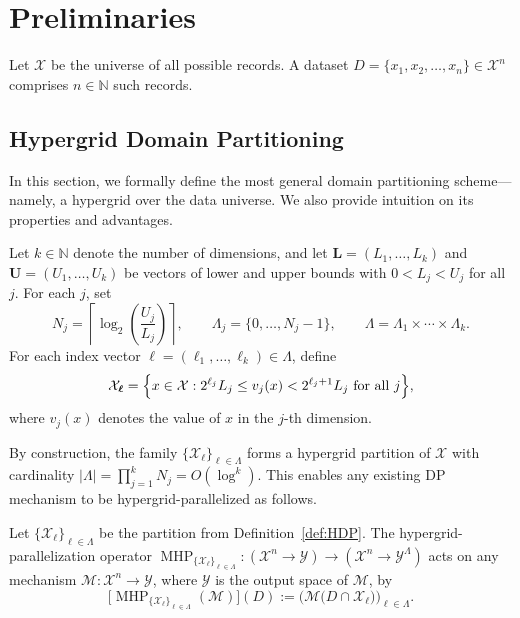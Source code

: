 \section{Preliminaries}
Let $\mathcal{X}$ be the universe of all possible records.  
A dataset $D=\{x_{1},x_{2},\ldots,x_{n}\}\in\mathcal{X}^{n}$ comprises $n\in\mathbb{N}$ such records.


\subsection{Hypergrid Domain Partitioning}
In this section, we formally define the most general domain partitioning scheme—namely, a hypergrid over the data universe.
We also provide intuition on its properties and advantages.

\begin{definition}\label{def:HDP}
Let $k\in\mathbb{N}$ denote the number of dimensions, and let $\mathbf{L}=(L_{1},\dots,L_{k})$ and $\mathbf{U}=(U_{1},\dots,U_{k})$ be vectors of lower and upper bounds
with $0<L_{j}<U_{j}$ for all $j$.  
For each $j$, set
\begin{equation*}
    N_{j}= \left\lceil \log_{2}\!\left( \frac{U_{j}}{L_{j}} \right) \right\rceil,
    \qquad
    \Lambda_{j}= \{0,\dots,N_{j}-1\},
    \qquad
    \Lambda=\Lambda_{1}\times\cdots\times\Lambda_{k}.
\end{equation*}
For each index vector $\boldsymbol{\ell}=(\ell_{1},\dots,\ell_{k})\in\Lambda$, define
\begin{equation*}
    \mathcal{X}_{\boldsymbol{\ell}}
    =\Bigl\{x\in\mathcal{X}:
        2^{\ell_{j}}L_{j}\le v_{j}(x)<2^{\ell_{j}+1}L_{j}
        \text{ for all }j\Bigr\},
\end{equation*}
where $v_{j}(x)$ denotes the value of $x$ in the $j$-th dimension.
\end{definition}


By construction, the family $\{\mathcal{X}_{\boldsymbol{\ell}}\}_{\boldsymbol{\ell}\in\Lambda}$ forms a hypergrid partition of $\mathcal{X}$ with cardinality $|\Lambda|=\prod_{j=1}^{k}N_{j}=O(\log^{k})$.
This enables any existing DP mechanism to be hypergrid-parallelized as follows.

\begin{definition}
Let $\{\mathcal{X}_{\boldsymbol{\ell}}\}_{\boldsymbol{\ell}\in\Lambda}$ be the partition from Definition~\ref{def:HDP}.  
The hypergrid-parallelization operator $\operatorname{MHP}_{\{\mathcal{X}_{\boldsymbol{\ell}}\}_{\boldsymbol{\ell}\in\Lambda}}:(\mathcal{X}^{n}\!\to\!\mathcal{Y})\longrightarrow(\mathcal{X}^{n}\!\to\!\mathcal{Y}^{\Lambda})$
acts on any mechanism $\mathcal{M}:\mathcal{X}^{n}\!\to\!\mathcal{Y}$, where $\mathcal{Y}$ is the output space of $\mathcal{M}$, by
\begin{equation*}
    \bigl[
        \operatorname{MHP}_{\{\mathcal{X}_{\boldsymbol{\ell}}\}_{\boldsymbol{\ell}\in\Lambda}}
        (\mathcal{M})
    \bigr](D)
    :=\bigl(
            \mathcal{M}\bigl(D\cap\mathcal{X}_{\boldsymbol{\ell}}\bigr)
      \bigr)_{\boldsymbol{\ell}\in\Lambda}.
\end{equation*}
\end{definition}

